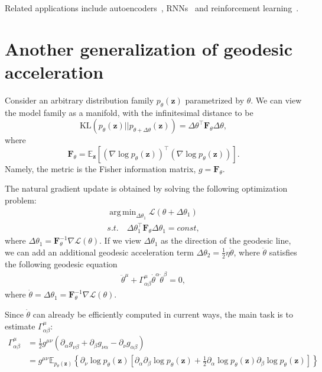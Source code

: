 \documentclass{amsart}
\theoremstyle{definition}
\DeclareMathOperator*{\argmin}{arg\,min}
\theoremstyle{remark}
\numberwithin{equation}{section}
\newcommand{\cal}[1]{\mathcal{#1}}
\newcommand{\mbf}[1]{\mathbf{#1}}
\newcommand{\mbb}[1]{\mathbb{#1}}
\begin{document}
Related applications include autoencoders~\cite{DeepMartens}, RNNs~\cite{RNNMartens} and reinforcement learning~\cite{EnergeticThomas}. 

\section{Another generalization of geodesic acceleration}
Consider an arbitrary distribution family $p_\theta(\mbf{z})$ parametrized by $\theta$. We can view the model family as a manifold, with the infinitesimal distance to be $$\mathrm{KL}(p_{\theta}(\mbf{z})||p_{\theta+\Delta \theta}(\mbf{z})) = \Delta \theta^\intercal \mbf{F}_\theta \Delta \theta,$$ where $$\mbf{F}_\theta = \mbb{E}_{\mbf{z}}[(\nabla \log p_\theta(\mbf{z}))^\intercal (\nabla \log p_\theta(\mbf{z}))].$$ Namely, the metric is the Fisher information matrix, $g = \mbf{F}_\theta$.

The natural gradient update is obtained by solving the following optimization problem:
\begin{gather*}
	\argmin_{\Delta\theta_1} \cal{L}(\theta+\Delta \theta_1) \\
	s.t.\quad \Delta\theta_1^\intercal \mbf{F}_\theta \Delta\theta_1 = const,
\end{gather*}
where $\Delta\theta_1 = \mbf{F}_\theta^{-1} \nabla \cal{L}(\theta)$. If we view $\Delta\theta_1$ as the direction of the geodesic line, we can add an additional geodesic acceleration term $\Delta\theta_2 = \frac{1}{2} \eta\ddot \theta$, where $\ddot \theta$ satisfies the following geodesic equation
\begin{align*}
\ddot \theta^{\mu} + \Gamma_{\alpha\beta}^{\mu} \dot \theta^{\alpha}\dot \theta^{\beta} = 0,
\end{align*}
where $\dot \theta = \Delta\theta_1 = \mbf{F}_\theta^{-1} \nabla \cal{L}(\theta)$.

Since $\dot \theta$ can already be efficiently computed in current ways, the main task is to estimate $\Gamma_{\alpha\beta}^\mu$:
\begin{align*}
\Gamma_{\alpha\beta}^\mu &= \frac{1}{2} g^{\mu\nu}(\partial_\alpha g_{\nu\beta} + \partial_\beta g_{\nu\alpha} - \partial_\nu g_{\alpha\beta})\\
&=g^{\mu\nu} \mbb{E}_{p_{\theta}(\mbf{z})}\left\{\partial_\nu\log p_\theta(\mbf{z})\left[\partial_\alpha\partial_\beta\log p_\theta(\mbf{z}) + \frac{1}{2}\partial_\alpha \log p_\theta(\mbf{z}) \partial_\beta \log p_\theta(\mbf{z})\right]\right\}
\end{align*}
\end{document}
